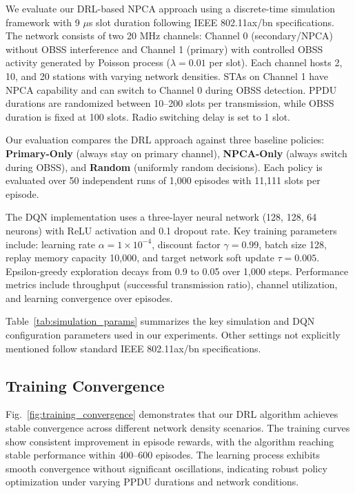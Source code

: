 \documentclass[conference]{IEEEtran}
\begin{document}
We evaluate our DRL-based NPCA approach using a discrete-time simulation framework with 9 $\mu$s slot duration following IEEE 802.11ax/bn specifications. The network consists of two 20 MHz channels: Channel 0 (secondary/NPCA) without OBSS interference and Channel 1 (primary) with controlled OBSS activity generated by Poisson process ($\lambda = 0.01$ per slot). Each channel hosts 2, 10, and 20 stations with varying network densities. STAs on Channel 1 have NPCA capability and can switch to Channel 0 during OBSS detection. PPDU durations are randomized between 10--200 slots per transmission, while OBSS duration is fixed at 100 slots. Radio switching delay is set to 1 slot.

Our evaluation compares the DRL approach against three baseline policies: \textbf{Primary-Only} (always stay on primary channel), \textbf{NPCA-Only} (always switch during OBSS), and \textbf{Random} (uniformly random decisions). Each policy is evaluated over 50 independent runs of 1,000 episodes with 11,111 slots per episode.

The DQN implementation uses a three-layer neural network (128, 128, 64 neurons) with ReLU activation and 0.1 dropout rate. Key training parameters include: learning rate $\alpha = 1 \times 10^{-4}$, discount factor $\gamma = 0.99$, batch size 128, replay memory capacity 10,000, and target network soft update $\tau = 0.005$. Epsilon-greedy exploration decays from 0.9 to 0.05 over 1,000 steps. Performance metrics include throughput (successful transmission ratio), channel utilization, and learning convergence over episodes.

Table~\ref{tab:simulation_params} summarizes the key simulation and DQN configuration parameters used in our experiments. Other settings not explicitly mentioned follow standard IEEE 802.11ax/bn specifications.




\subsection{Training Convergence}

Fig.~\ref{fig:training_convergence} demonstrates that our DRL algorithm achieves stable convergence across different network density scenarios. The training curves show consistent improvement in episode rewards, with the algorithm reaching stable performance within 400--600 episodes. The learning process exhibits smooth convergence without significant oscillations, indicating robust policy optimization under varying PPDU durations and network conditions.
\end{document}
